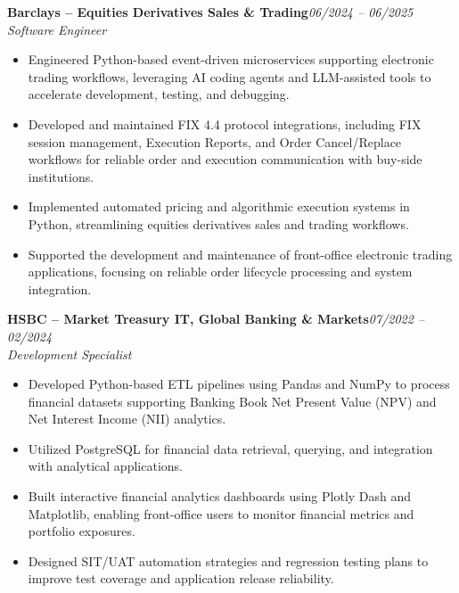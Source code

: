 \documentclass[10pt,a4paper]{article}
\newcommand{\experience}[3]{%
    \Needspace{5\baselineskip}
    \textbf{#1}\hfill\textit{#3}\\
    \textit{#2}\par
}
\begin{document}
\vspace{0.8ex}

\experience
{Barclays -- Equities Derivatives Sales \& Trading}
{Software Engineer}
{06/2024 -- 06/2025}

\begin{itemize}
    \item Engineered Python-based event-driven microservices
    supporting electronic trading workflows, leveraging
    AI coding agents and LLM-assisted tools to accelerate
    development, testing, and debugging.

    \item Developed and maintained FIX 4.4 protocol
    integrations, including FIX session management,
    Execution Reports, and Order Cancel/Replace workflows
    for reliable order and execution communication
    with buy-side institutions.

    \item Implemented automated pricing and algorithmic
    execution systems in Python, streamlining equities
    derivatives sales and trading workflows.

    \item Supported the development and maintenance
    of front-office electronic trading applications,
    focusing on reliable order lifecycle processing
    and system integration.
\end{itemize}

\vspace{0.8ex}

\experience
{HSBC -- Market Treasury IT, Global Banking \& Markets}
{Development Specialist}
{07/2022 -- 02/2024}

\begin{itemize}
    \item Developed Python-based ETL pipelines using
    Pandas and NumPy to process financial datasets
    supporting Banking Book Net Present Value (NPV)
    and Net Interest Income (NII) analytics.

    \item Utilized PostgreSQL for financial data retrieval,
    querying, and integration with analytical applications.

    \item Built interactive financial analytics dashboards
    using Plotly Dash and Matplotlib, enabling front-office
    users to monitor financial metrics and portfolio exposures.

    \item Designed SIT/UAT automation strategies and
    regression testing plans to improve test coverage
    and application release reliability.
\end{itemize}
\end{document}
